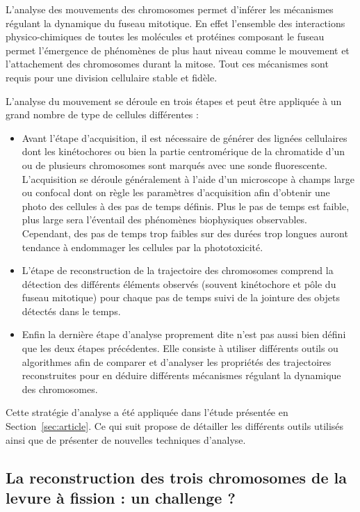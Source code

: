 \documentclass[12pt,a4paper,twoside,openright]{book}
\begin{document}
L'analyse des mouvements des chromosomes permet d'inférer les mécanismes
régulant la dynamique du fuseau mitotique. En effet l'ensemble des
interactions physico-chimiques de toutes les molécules et protéines
composant le fuseau permet l'émergence de phénomènes de plus haut niveau
comme le mouvement et l'attachement des chromosomes durant la mitose.
Tout ces mécanismes sont requis pour une division cellulaire stable et
fidèle.

L'analyse du mouvement se déroule en trois étapes et peut être appliquée
à un grand nombre de type de cellules différentes :

\begin{itemize}
\item
  Avant l'étape d'acquisition, il est nécessaire de générer des lignées
  cellulaires dont les kinétochores ou bien la partie centromérique de
  la chromatide d'un ou de plusieurs chromosomes sont marqués avec une
  sonde fluorescente. L'acquisition se déroule généralement à l'aide
  d'un microscope à champs large ou confocal dont on règle les
  paramètres d'acquisition afin d'obtenir une photo des cellules à des
  pas de temps définis. Plus le pas de temps est faible, plus large sera
  l'éventail des phénomènes biophysiques observables. Cependant, des pas
  de temps trop faibles sur des durées trop longues auront tendance à
  endommager les cellules par la phototoxicité.
\item
  L'étape de reconstruction de la trajectoire des chromosomes comprend
  la détection des différents éléments observés (souvent kinétochore et
  pôle du fuseau mitotique) pour chaque pas de temps suivi de la
  jointure des objets détectés dans le temps.
\item
  Enfin la dernière étape d'analyse proprement dite n'est pas aussi bien
  défini que les deux étapes précédentes. Elle consiste à utiliser
  différents outils ou algorithmes afin de comparer et d'analyser les
  propriétés des trajectoires reconstruites pour en déduire différents
  mécanismes régulant la dynamique des chromosomes.
\end{itemize}

Cette stratégie d'analyse a été appliquée dans l'étude présentée en
Section~\ref{sec:article}. Ce qui suit propose de détailler les
différents outils utilisés ainsi que de présenter de nouvelles
techniques d'analyse.

\subsection{La reconstruction des trois chromosomes de la levure à
fission : un challenge
?}\label{la-reconstruction-des-trois-chromosomes-de-la-levure-uxe0-fission-un-challenge}
\end{document}
